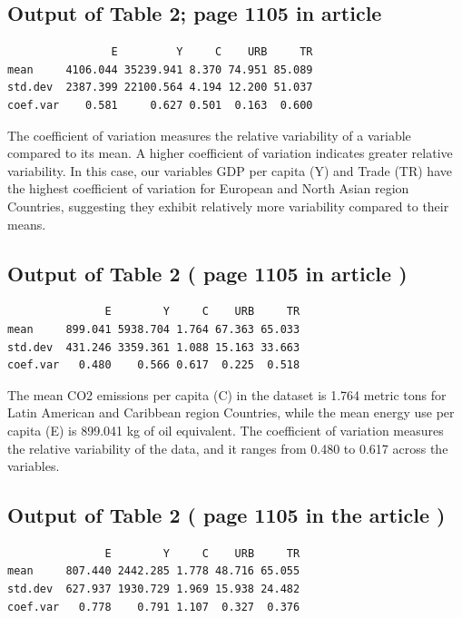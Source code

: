 \documentclass[
  11pt,
]{article}
\begin{document}
\hypertarget{output-of-table-2-page-1105-in-article}{%
\subsection{Output of Table 2; page 1105 in
article}\label{output-of-table-2-page-1105-in-article}}

\begin{verbatim}
                E         Y     C    URB     TR
mean     4106.044 35239.941 8.370 74.951 85.089
std.dev  2387.399 22100.564 4.194 12.200 51.037
coef.var    0.581     0.627 0.501  0.163  0.600
\end{verbatim}

The coefficient of variation measures the relative variability of a
variable compared to its mean. A higher coefficient of variation
indicates greater relative variability. In this case, our variables GDP
per capita (Y) and Trade (TR) have the highest coefficient of variation
for European and North Asian region Countries, suggesting they exhibit
relatively more variability compared to their means.

\hypertarget{output-of-table-2-page-1105-in-article-1}{%
\subsection{Output of Table 2 ( page 1105 in article
)}\label{output-of-table-2-page-1105-in-article-1}}

\begin{verbatim}
               E        Y     C    URB     TR
mean     899.041 5938.704 1.764 67.363 65.033
std.dev  431.246 3359.361 1.088 15.163 33.663
coef.var   0.480    0.566 0.617  0.225  0.518
\end{verbatim}

The mean CO2 emissions per capita (C) in the dataset is 1.764 metric
tons for Latin American and Caribbean region Countries, while the mean
energy use per capita (E) is 899.041 kg of oil equivalent. The
coefficient of variation measures the relative variability of the data,
and it ranges from 0.480 to 0.617 across the variables.

\hypertarget{output-of-table-2-page-1105-in-the-article}{%
\subsection{Output of Table 2 ( page 1105 in the article
)}\label{output-of-table-2-page-1105-in-the-article}}

\begin{verbatim}
               E        Y     C    URB     TR
mean     807.440 2442.285 1.778 48.716 65.055
std.dev  627.937 1930.729 1.969 15.938 24.482
coef.var   0.778    0.791 1.107  0.327  0.376
\end{verbatim}
\end{document}
